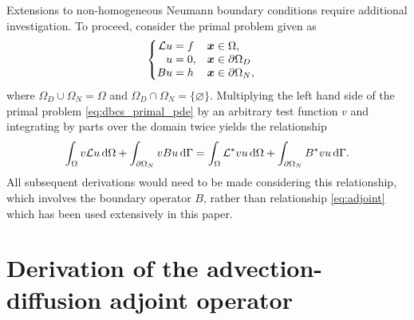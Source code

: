 Extensions to non-homogeneous Neumann boundary conditions
require additional investigation. To proceed,
consider the primal problem given as
%
\begin{gather}
\begin{cases}
\begin{aligned}
\mathcal{L} u &= f & & \boldsymbol{x} \in \Omega, \\
u &= 0, & & \boldsymbol{x} \in \partial \Omega_D \\
B u &= h & & \boldsymbol{x} \in \partial \Omega_N,
\end{aligned}
\end{cases}
\label{eq:dbcs_primal_pde}
\end{gather}
%
where $\Omega_D \cup \Omega_N = \Omega$ and $\Omega_D \cap \Omega_N =
\{ \varnothing \}$. Multiplying the left hand side of the
primal problem \eqref{eq:dbcs_primal_pde}
by an arbitrary test function $v$ and integrating by parts over the
domain twice yields the relationship
%
\begin{gather}
\int_{\Omega} v \mathcal{L} u \, \text{d} \Omega +
\int_{\partial \Omega_N} v B u \, \text{d} \Gamma =
\int_{\Omega} \mathcal{L}^* v u \, \text{d} \Omega +
\int_{\partial \Omega_N} B^* v u \, \text{d} \Gamma.
\end{gather}
%
All subsequent derivations would need to be
made considering this relationship, which involves
the boundary operator $B$, rather than
relationship \eqref{eq:adjoint} which has
been used extensively in this paper.

\section{Derivation of the advection-diffusion adjoint operator}
\label{app:adjoint}

